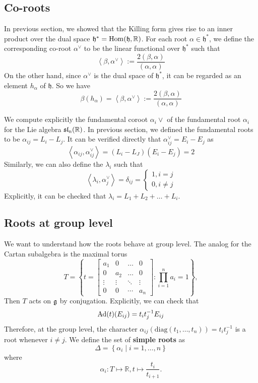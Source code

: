 \subsection{Co-roots}
In previous section, we showed that the Killing form gives rise to an inner product over 
the dual space $\mathfrak{h}^* = \operatorname{Hom}(\mathfrak{h}, \mathbb{R})$. For each root $\alpha \in \mathfrak{h}^*$, we define the 
corresponding co-root $\alpha^\vee$ to be the linear functional over $\mathfrak{h}^*$ such that
\[\left\langle \beta, \alpha^\vee\right\rangle:= \dfrac{2(\beta,\alpha)}{(\alpha,\alpha)}\]
On the other hand, since $\alpha^\vee$ is the dual space of $\mathfrak{h}^*$, it can be regarded 
as an element $h_\alpha$ of $\mathfrak{h}$. So we have 
\[\beta(h_\alpha)=\left\langle \beta, \alpha^\vee\right\rangle:= \dfrac{2(\beta,\alpha)}{(\alpha,\alpha)} \]
\begin{example}
    We compute explicitly the fundamental coroot $\alpha_i\vee$ of the fundamental root $\alpha_i$ for the Lie algebra 
    $\operatorname{\mathfrak{sl}_n(\mathbb{R})}$. In previous section, we defined the fundamental roots to be $\alpha_{ij} = L_i-L_j$. It can be 
    verified directly that $\alpha_{ij}^\vee = E_i-E_{j}$ as 
    \[\left\langle \alpha_{ij}, \alpha_{ij}^\vee \right\rangle = (L_i-L_J)(E_i-E_j)=2\]
    Similarly, we can also define the $\lambda_i$ such that 
    \[\left\langle \lambda_i,\alpha_j^\vee\right\rangle = \delta_{ij} = \begin{cases}
        1, i =j\\
        0, i \ne j
    \end{cases}\]
    Explicitly, it can be checked that $\lambda_i = L_1+L_2+\ldots+L_i$.
\end{example}
\subsection{Roots at group level}
We want to understand how the roots behave at group level. The analog for the Cartan subalgebra is the maximal torus
\[T = \left\lbrace t= \begin{bmatrix}
        a_1    & 0      & \ldots & 0      \\
        0      & a_2    & \ldots & 0      \\
        \vdots & \vdots & \ddots & \vdots \\
        0      & 0      & \cdots & a_n
    \end{bmatrix} :  \prod_{i=1}^na_i =1\right\rbrace, \label{torus}\]
Then $T$ acts on $\operatorname{\mathfrak{g}}$ by conjugation. Explicitly, we can check that
\[\operatorname{\text{Ad}}(t)(E_{ij}) = t_it_j^{-1}E_{ij}\]
Therefore, at the group level, the character $\alpha_{ij}(\text{diag}(t_1,\ldots,t_n))=t_it_j^{-1}$
is a root whenever $i \ne j$. We define the set of  \textbf{simple roots} as
\[\Delta = \left\lbrace \alpha_i\mid i =1,\ldots,n \right\rbrace\]
where
\[\alpha_i \colon T \mapsto \mathbb{R}, t \mapsto \dfrac{t_i}{t_{i+1}}.\]

